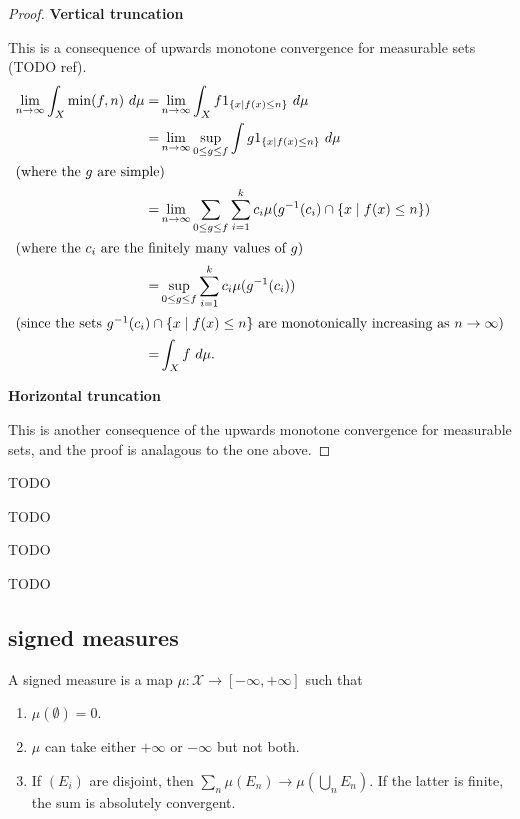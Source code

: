 \documentclass[12pt]{article}
\begin{document}
\begin{proof}
	\hfill
	\newline
	\textbf{Vertical truncation}

	This is a consequence of upwards monotone convergence for measurable sets (TODO ref). 
	\begin{align*}
		\lim_{n\to\infty}\int_X \min(f,n)\ d\mu =& \lim_{n\to\infty}\int_X f 1_{\{x\mid f(x)\leq n\}}\ d\mu \\
		=& \lim_{n\to\infty}\sup_{0\leq g\leq f}\int g 1_{\{x\mid f(x)\leq n\}}\ d\mu \\
		\intertext{(where the $g$ are simple)}
		=& \lim_{n\to\infty}\sum_{0\leq g\leq f}\sum_{i=1}^k c_i\mu(g^{-1}(c_i)\cap \{x\mid f(x)\leq n\}) \\
		\intertext{(where the $c_i$ are the finitely many values of $g$)}
		=& \sup_{0\leq g\leq f}\sum_{i=1}^k c_i \mu(g^{-1}(c_i)) \\
		\intertext{(since the sets $g^{-1}(c_i)\cap \{x\mid f(x)\leq n\}$ are monotonically increasing as $n\to\infty$)}
		=& \int_X f\ d\mu.
	\end{align*}

	\textbf{Horizontal truncation}

	This is another consequence of the upwards monotone convergence for measurable sets, and the proof is analagous to the one above.
\end{proof}

\begin{theorem}
	TODO
\end{theorem}

\begin{proposition}[linearity in $\mu$]
	TODO
\end{proposition}

\begin{proposition}
	TODO
\end{proposition}

\begin{definition}
	TODO
\end{definition}


\subsection{signed measures} %

\begin{definition}
	A signed measure is a map $\mu:\mathcal{X}\to[-\infty,+\infty]$ such that 
	\begin{enumerate}
		\item $\mu(\emptyset)=0$.
		\item $\mu$ can take either $+\infty$ or $-\infty$ but not both.
		\item If $(E_i)$ are disjoint, then $\sum_n\mu(E_n)\to\mu(\bigcup_n E_n)$. If the latter is finite, the sum is absolutely convergent. 
	\end{enumerate}
\end{definition}
\end{document}
